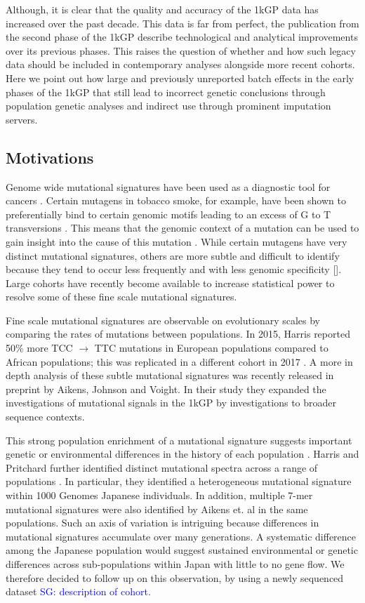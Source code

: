 \documentclass[9pt,lineno]{elife}
\newcommand{\sgcomment}[1]{\textcolor{blue}{SG: #1}}
\begin{document}
Although, it is clear that the quality and accuracy of the 1kGP data has increased over the past decade. 
This data is far from perfect, the publication from the second phase of the 1kGP describe technological and analytical improvements over its previous phases.
This raises the question of whether and how such legacy data should be included in contemporary analyses alongside more recent cohorts. 
Here we point out how large and previously unreported batch effects in the early phases of the 1kGP that still lead to incorrect genetic conclusions through population genetic analyses and indirect use through prominent imputation servers.  

\subsection{Motivations}

Genome wide mutational signatures have been used as a diagnostic tool for cancers \cite{Pleasance2010,Shiraishi2015a}.
Certain mutagens in tobacco smoke, for example, have been shown to preferentially bind to certain genomic motifs leading to an excess of G to T transversions \cite{Pleasance2010}.
This means that the genomic context of a mutation can be used to gain insight into the cause of this mutation \cite{Pleasance2010}.
While certain mutagens have very distinct mutational signatures, others are more subtle and difficult to identify because they tend to occur less frequently and with less genomic specificity [\cite{}].
Large cohorts have recently become available to increase statistical power to resolve some of these fine scale mutational signatures.

Fine scale mutational signatures are observable on evolutionary scales by comparing the rates of mutations between populations.
In 2015, Harris reported 50\% more TCC ${\rightarrow}$ TTC mutations in European populations compared to African populations; this was replicated in a different cohort in 2017 \cite{Harris2015a}.
A more in depth analysis of these subtle mutational signatures was recently released in preprint by Aikens, Johnson and Voight. \cite{}
In their study they expanded the investigations of mutational signals in the 1kGP by investigations to broader sequence contexts.

This strong population enrichment of a mutational signature suggests important genetic or environmental differences in the history of each population \cite{Harris2015a}. 
Harris and Pritchard further identified distinct mutational spectra across a range of populations \cite{Harris2017a}. 
In particular, they identified a heterogeneous mutational signature within 1000 Genomes Japanese individuals.
In addition, multiple 7-mer mutational signatures were also identified by Aikens et. al in the same populations. \cite{}
Such an axis of variation is intriguing because differences in mutational signatures accumulate over many generations.
A systematic difference among the Japanese population would suggest sustained environmental or genetic differences across sub-populations within Japan with little to no gene flow.
We therefore decided to follow up on this observation, by using a newly sequenced dataset \sgcomment{description of cohort.}
\end{document}
